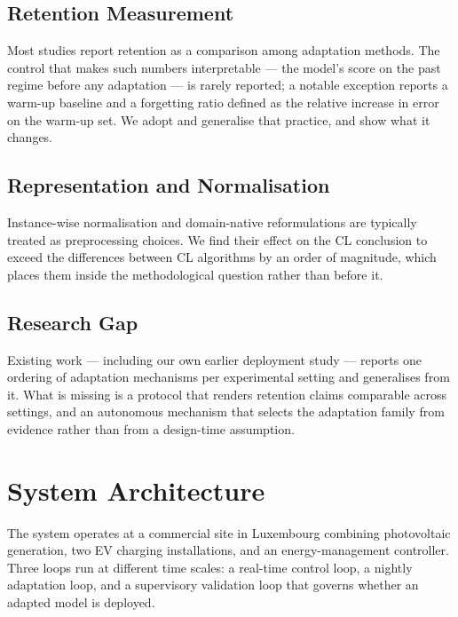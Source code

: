 \documentclass[journal]{IEEEtran}
\begin{document}
\subsection{Retention Measurement}
Most studies report retention as a comparison among adaptation methods. The
control that makes such numbers interpretable --- the model's score on the past
regime before any adaptation --- is rarely reported; a notable exception reports
a warm-up baseline and a forgetting ratio defined as the relative increase in
error on the warm-up set. We adopt and generalise that practice, and show what
it changes.

\subsection{Representation and Normalisation}
Instance-wise normalisation and domain-native reformulations are typically
treated as preprocessing choices. We find their effect on the CL conclusion to
exceed the differences between CL algorithms by an order of magnitude, which
places them inside the methodological question rather than before it.

\subsection{Research Gap}
\label{sec:gap}
Existing work --- including our own earlier deployment study --- reports one
ordering of adaptation mechanisms per experimental setting and generalises from
it. What is missing is a protocol that renders retention claims comparable
across settings, and an autonomous mechanism that selects the adaptation family
from evidence rather than from a design-time assumption.

\section{System Architecture}
\label{sec:arch}


The system operates at a commercial site in Luxembourg combining photovoltaic
generation, two EV charging installations, and an energy-management controller.
Three loops run at different time scales: a real-time control loop, a nightly
adaptation loop, and a supervisory validation loop that governs whether an
adapted model is deployed.
\end{document}
